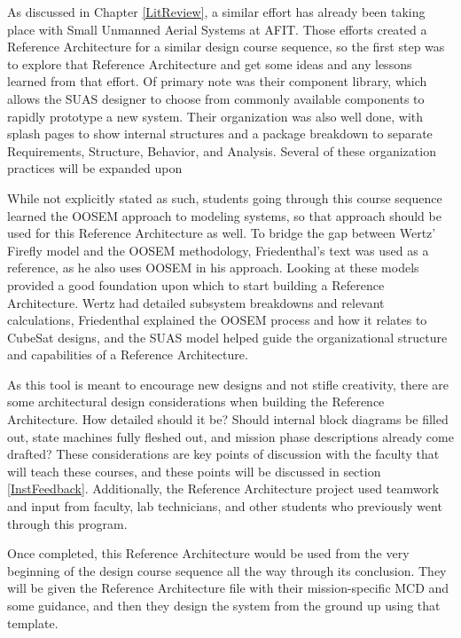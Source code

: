 As discussed in Chapter \ref{LitReview}, a similar effort has already been taking place with Small Unmanned Aerial Systems at AFIT. Those efforts created a Reference Architecture for a similar design course sequence, so the first step was to explore that Reference Architecture and get some ideas and any lessons learned from that effort. Of primary note was their component library, which allows the SUAS designer to choose from commonly available components to rapidly prototype a new system. Their organization was also well done, with splash pages to show internal structures and a package breakdown to separate Requirements, Structure, Behavior, and Analysis. Several of these organization practices will be expanded upon

While not explicitly stated as such, students going through this course sequence learned the OOSEM approach to modeling systems, so that approach should be used for this Reference Architecture as well. To bridge the gap between Wertz' Firefly model and the OOSEM methodology, Friedenthal's text was used as a reference, as he also uses OOSEM in his approach. Looking at these models provided a good foundation upon which to start building a Reference Architecture. Wertz had detailed subsystem breakdowns and relevant calculations, Friedenthal explained the OOSEM process and how it relates to CubeSat designs, and the SUAS model helped guide the organizational structure and capabilities of a Reference Architecture.

As this tool is meant to encourage new designs and not stifle creativity, there are some architectural design considerations when building the Reference Architecture. How detailed should it be? Should internal block diagrams be filled out, state machines fully fleshed out, and mission phase descriptions already come drafted? These considerations are key points of discussion with the faculty that will teach these courses, and these points will be discussed in section  \ref{InstFeedback}. Additionally, the Reference Architecture project used teamwork and input from faculty, lab technicians, and other students who previously went through this program.

Once completed, this Reference Architecture would be used from the very beginning of the design course sequence all the way through its conclusion. They will be given the Reference Architecture file with their mission-specific MCD and some guidance, and then they design the system from the ground up using that template. 

